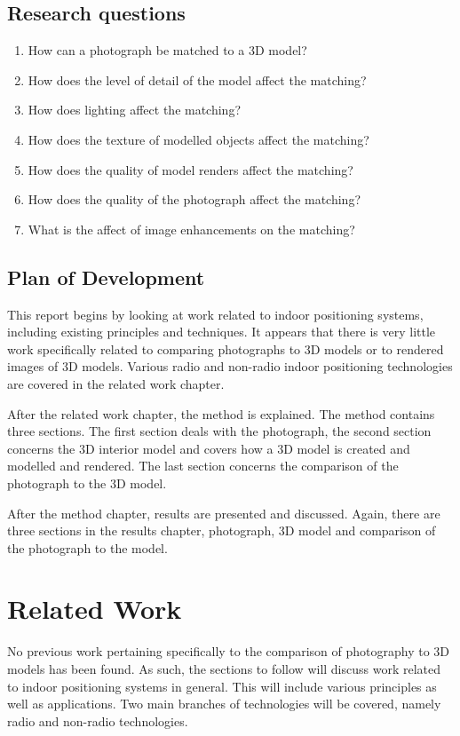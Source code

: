 \documentclass[11pt,a4paper]{report}
\begin{document}
	\section{Research questions}
		\begin{enumerate}
			\item How can a photograph be matched to a 3D model?
			\item How does the level of detail of the model affect the matching?
			\item How does lighting affect the matching?
			\item How does the texture of modelled objects affect the matching?
			\item How does the quality of model renders affect the matching?
			\item How does the quality of the photograph affect the matching?
			\item What is the affect of image enhancements on the matching?
		\end{enumerate}
	
	\section{Plan of Development}
		This report begins by looking at work related to indoor positioning systems, including existing principles and techniques. It appears that there is very little work specifically related to comparing photographs to 3D models or to rendered images of 3D models. Various radio and non-radio indoor positioning technologies are covered in the related work chapter.
		
		After the related work chapter, the method is explained. The method contains three sections. The first section deals with the photograph, the second section concerns the 3D interior model and covers how a 3D model is created and modelled and rendered. The last section concerns the comparison of the photograph to the 3D model.
		
		After the method chapter, results are presented and discussed. Again, there are three sections in the results chapter, photograph, 3D model and comparison of the photograph to the model.

\newpage
\chapter{Related Work}
	No previous work pertaining specifically to the comparison of photography to 3D models has been found. As such, the sections to follow will discuss work related to indoor positioning systems in general. This will include various principles as well as applications. Two main branches of technologies will be covered, namely radio and non-radio technologies.
	
\end{document}
